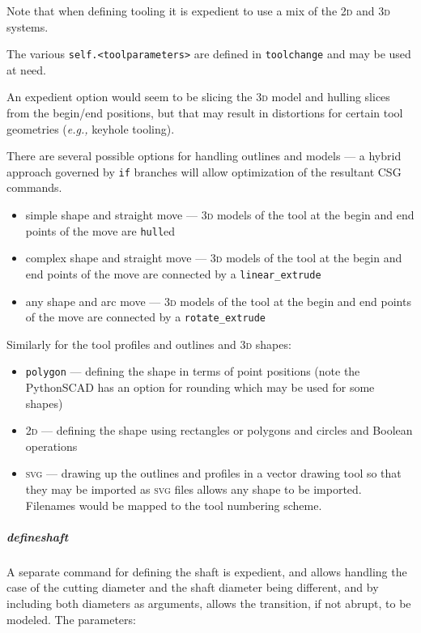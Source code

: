\documentclass{ltxdoc}
\begin{document}
Note that when defining tooling it is expedient to use a mix of the \textsc{2d} and \textsc{3d} systems.

The various \verb|self.<toolparameters>| are defined in \verb|toolchange| and may be used at need.

An expedient option would seem to be slicing the \textsc{3d} model and hulling slices from the begin/end positions, but that may result in distortions for certain tool geometries (\emph{e.g.,} keyhole tooling).

There are several possible options for handling outlines and models --- a hybrid approach governed by \verb|if| branches will allow optimization of the resultant CSG commands. 

\begin{itemize}
\item simple shape and straight move --- \textsc{3d} models of the tool at the begin and end points of the move are \verb|hull|ed 
\item complex shape and straight move --- \textsc{3d} models of the tool at the begin and end points of the move are connected by a \verb|linear_extrude|
\item any shape and arc move --- \textsc{3d} models of the tool at the begin and end points of the move are connected by a \verb|rotate_extrude|
\end{itemize}

Similarly for the tool profiles and outlines and \textsc{3d} shapes:

\begin{itemize}
\item \verb|polygon| --- defining the shape in terms of point positions (note the PythonSCAD has an option for rounding which may be used for some shapes)
\item \textsc{2d} --- defining the shape using rectangles or polygons and circles and Boolean operations
\item \textsc{svg} --- drawing up the outlines and profiles in a vector drawing tool so that they may be imported as \textsc{svg} files allows any shape to be imported. Filenames would be mapped to the tool numbering scheme.
\end{itemize}

\subparagraph{defineshaft}

A separate command for defining the shaft is expedient, and allows handling the case of the cutting diameter and the shaft diameter being different, and by including both diameters as arguments, allows the transition, if not abrupt, to be modeled. The parameters:
\end{document}
